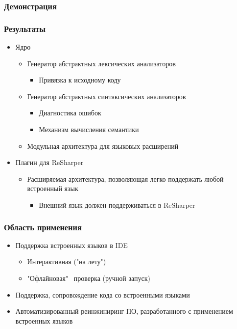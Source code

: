 \documentclass{beamer}
\begin{document}
\begin{frame}[fragile]
	\transwipe[direction=90]
	\frametitle{Демонстрация}
		\begin{center}
		\end{center}
\end{frame}

\begin{frame}[fragile]
	\transwipe[direction=90]
	\frametitle{Результаты}
	\begin{itemize}
	    \item Ядро
	    \begin{itemize}
	        \item Генератор абстрактных лексических анализаторов
    	    \begin{itemize}
                \item Привязка к исходному коду
	        \end{itemize}
	        \item Генератор абстрактных синтаксических анализаторов
    	    \begin{itemize}
                \item Диагностика ошибок
                \item Механизм вычисления семантики
	        \end{itemize}
            \item Модульная архитектура для языковых расширений
        \end{itemize}
	    \item Плагин для ReSharper
	    \begin{itemize}
	        \item Расширяемая архитектура, позволяющая легко поддержать любой встроенный язык
	        \begin{itemize}
	            \item Внешний язык должен поддерживаться в ReSharper
            \end{itemize}
        \end{itemize}
	\end{itemize}
\end{frame}

\begin{frame}
	\transwipe[direction=90]
	\frametitle{Область применения}
	\begin{itemize}
		\item Поддержка встроенных языков в IDE
    	\begin{itemize}
            \item Интерактивная ("на лету")
            \item "Офлайновая" \ проверка (ручной запуск)
        \end{itemize}
        \item Поддержка, сопровождение кода со встроенными языками
		\item Автоматизированный реинжиниринг ПО, разработанного с применением встроенных языков
	\end{itemize}
\end{frame}
\end{document}
